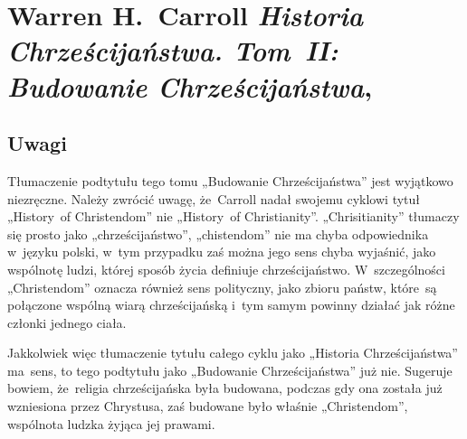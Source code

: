 \documentclass[a4paper,11pt]{article}
\numberwithin{equation}{section}
\begin{document}










\section{Warren H.~Carroll \textit{Historia Chrześcijaństwa.
    Tom~II: Budowanie Chrześcijaństwa},
  \cite{CarrollHistoriaChrzecijanstwaVolII2010}}



\subsection{Uwagi}



\noindent
Tłumaczenie podtytułu tego tomu „Budowanie Chrześcijaństwa” jest wyjątkowo
niezręczne. Należy zwrócić uwagę, że~Carroll nadał swojemu cyklowi tytuł
„History~of Christendom” nie „History~of Christianity”. „Chrisitianity”
tłumaczy się prosto jako „chrześcijaństwo”, „chistendom” nie ma chyba
odpowiednika w~języku polski, w~tym przypadku zaś można jego sens chyba
wyjaśnić, jako wspólnotę ludzi, której sposób życia definiuje
chrześcijaństwo. W~szczególności „Christendom” oznacza również sens
polityczny, jako zbioru państw, które~są połączone wspólną wiarą
chrześcijańską i~tym samym powinny działać jak różne członki jednego ciała.

Jakkolwiek więc tłumaczenie tytułu całego cyklu jako „Historia
Chrześcijaństwa” ma~sens, to tego podtytułu jako „Budowanie
Chrześcijaństwa” już nie. Sugeruje bowiem, że~religia chrześcijańska
była budowana, podczas gdy ona została już wzniesiona przez Chrystusa,
zaś budowane było właśnie „Christendom”, wspólnota ludzka żyjąca jej
prawami.

\VerSpaceFour










\newpage

\end{document}
